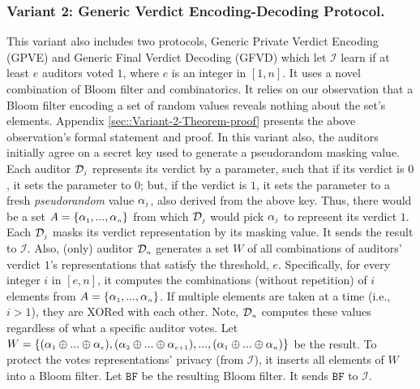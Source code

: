 \vspace{-1mm}
\subsubsection{Variant 2: Generic Verdict  Encoding-Decoding Protocol.} This variant also includes two protocols, Generic Private Verdict Encoding (GPVE) and Generic Final Verdict Decoding (GFVD) which   let $\mathcal{I}$ learn if at least $e$ auditors voted $1$, where $e$ is an integer in  $[1, n]$. It  uses a novel combination of   Bloom filter and combinatorics. It  relies on our observation that a Bloom filter  encoding a set of random values reveals nothing about the set's elements.  Appendix \ref{sec::Variant-2-Theorem-proof} presents the above observation's formal statement and  proof.  
%
In this variant  also, the auditors initially agree on a secret key  used  to  generate a pseudorandom masking value. Each auditor $\mathcal{D}_{\scriptscriptstyle j}$ represents its verdict by a parameter, such that if its verdict is $0$,   it  sets the parameter to  $0$; but, if   the verdict is $1$, it sets the parameter to a fresh \emph{pseudorandom} value $\alpha_{\scriptscriptstyle j}$, also derived from the above key. Thus, there would be a set $A=\{\alpha_{\scriptscriptstyle 1},..., \alpha_{\scriptscriptstyle n}\}$ from which   $\mathcal{D}_{\scriptscriptstyle j}$ would pick $\alpha_{\scriptscriptstyle j}$ to represent its verdict $1$. Each $\mathcal{D}_{\scriptscriptstyle j}$ masks its verdict representation by its masking  value. It sends the result to $\mathcal{I}$. Also, (only) auditor $\mathcal{D}_{\scriptscriptstyle n}$  generates a set $W$  of all  combinations of auditors' verdict $1$'s representations that satisfy the threshold, $e$.  Specifically,  for every integer $i$ in $[e, n]$, it computes the combinations (without repetition) of $i$ elements from  $A=\{\alpha_{\scriptscriptstyle 1},..., \alpha_{\scriptscriptstyle n}\}$. If  multiple elements are taken at a time (i.e., $i>1$), they are XORed with each other.   Note, $\mathcal{D}_{\scriptscriptstyle n}$ computes these values    regardless of what a specific  auditor  votes.   Let $W=\{(\alpha_{\scriptscriptstyle 1}\oplus ... \oplus \alpha_{\scriptscriptstyle e}),  (\alpha_{\scriptscriptstyle 2}\oplus  ... \oplus \alpha_{\scriptscriptstyle e+1}), ..., (\alpha_{\scriptscriptstyle 1}\oplus ... \oplus \alpha_{\scriptscriptstyle n})\}$ be the result. To protect   the votes representations' privacy (from $\mathcal{I}$), it inserts all elements of $W$ into a Bloom filter. Let $\mathtt{BF}$ be the resulting Bloom filter. It sends $\mathtt{BF}$ to $\mathcal{I}$. 


